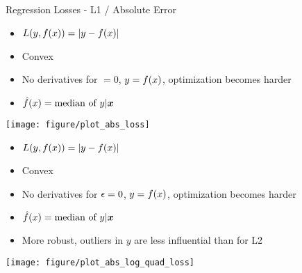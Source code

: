 \begin{vbframe}{Regression Losses - L1 / Absolute Error}
\begin{itemize}
\item $L(y, f(x)) = |y-f(x)|$
\item Convex
\item No derivatives for $ = 0$, $y = f(x)$, optimization becomes harder
\item $\hat{f}(x) = \text{median of } y | \bm{x}$
\end{itemize}

\begin{knitrout}\scriptsize
{}\color{fgcolor}

{\centering \texttt{[image: figure/plot\_abs\_loss]} 

}



\end{knitrout}

\framebreak

\begin{itemize}
\item $L(y, f(x)) = |y-f(x)|$
\item Convex
\item No derivatives for $\epsilon = 0$, $y = f(x)$, optimization becomes harder
\item $\hat{f}(x) = \text{median of } y | \bm{x}$
\item More robust, outliers in $y$ are less influential than for L2
\end{itemize}

\begin{knitrout}\scriptsize
{}\color{fgcolor}

{\centering \texttt{[image: figure/plot\_abs\_log\_quad\_loss]} 

}



\end{knitrout}

\end{vbframe}

